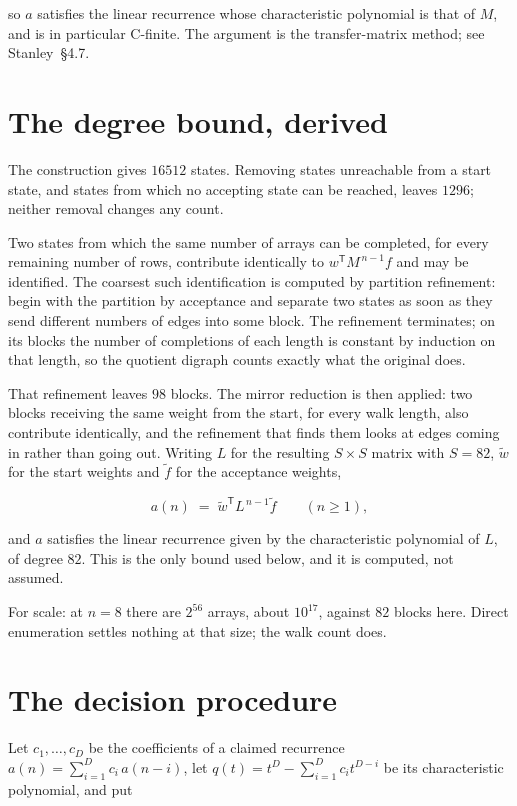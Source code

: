 \documentclass[11pt]{article}
\theoremstyle{definition}
\begin{document}
so $a$ satisfies the linear recurrence whose characteristic polynomial is that of $M$, and is in particular C-finite. The argument is the transfer-matrix method; see Stanley~\S4.7.

\section{The degree bound, derived}

The construction gives $16512$ states. Removing states unreachable from a start state, and states from which no accepting state can be reached, leaves $1296$; neither removal changes any count.

Two states from which the same number of arrays can be completed, for every remaining number of rows, contribute identically to $w^{\mathsf T}M^{\,n-1}f$ and may be identified. The coarsest such identification is computed by partition refinement: begin with the partition by acceptance and separate two states as soon as they send different numbers of edges into some block. The refinement terminates; on its blocks the number of completions of each length is constant by induction on that length, so the quotient digraph counts exactly what the original does.

That refinement leaves $98$ blocks. The mirror reduction is then applied: two blocks receiving the same weight from the start, for every walk length, also contribute identically, and the refinement that finds them looks at edges coming in rather than going out. Writing $L$ for the resulting $S \times S$ matrix with $S = 82$, $\tilde w$ for the start weights and $\tilde f$ for the acceptance weights,

\[a(n) \;=\; \tilde w^{\mathsf T} L^{\,n-1} \tilde f \qquad (n \ge 1),\]

and $a$ satisfies the linear recurrence given by the characteristic polynomial of $L$, of degree $82$. This is the only bound used below, and it is computed, not assumed.

For scale: at $n = 8$ there are $2^{56}$ arrays, about $10^{17}$, against $82$ blocks here. Direct enumeration settles nothing at that size; the walk count does.

\section{The decision procedure}

Let $c_1,\dots,c_D$ be the coefficients of a claimed recurrence $a(n) = \sum_{i=1}^{D} c_i\,a(n-i)$, let $q(t) = t^{D} - \sum_{i=1}^{D} c_i t^{D-i}$ be its characteristic polynomial, and put
\end{document}
